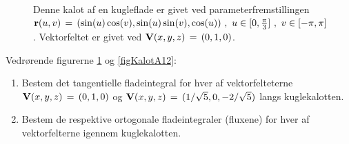 \begin{figure}[h]
\begin{center}
\caption{\small{Denne kalot af en kugleflade er
givet ved parameterfremstillingen ${\bf r}(u, v)
\, = \, (\sin(u)\cos(v), \sin(u)\sin(v), \cos(u)
) \,\,, \,\, u \in [0, \frac{\pi}{3}]\,\, , \, \,
v \in [-\pi, \pi]\, $. Vektorfeltet er givet ved
${\bf V}(x,y,z) \, = \, (0, 1,0)$.}} \label{figKalot12}
\end{center}
\end{figure}

\begin{exercise}
Vedrørende figurerne \ref{figKalot12} og \ref{figKalotA12}:
\begin{enumerate}
\item Bestem det tangentielle
fladeintegral for hver af vektorfelteterne ${\bf V}(x,y,z)\,
= \, (0, 1, 0)$ og ${\bf V}(x,y,z)\,
= \, (1/\sqrt{5}, 0, -2/\sqrt{5})$   langs kuglekalotten.
\item Bestem de respektive ortogonale fladeintegraler (fluxene) for hver af
vektorfelterne igennem kuglekalotten.
\end{enumerate}
\end{exercise}


